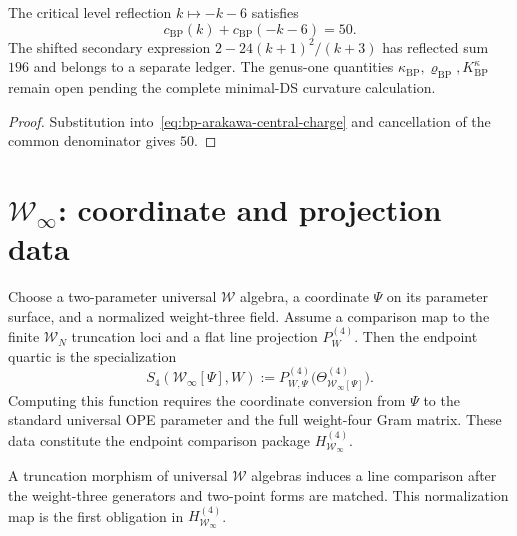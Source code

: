 \begin{corollary}
\label{cor:bp-feigin-frenkel-complementarity}
The critical level reflection $k\mapsto-k-6$ satisfies
\[
 c_{\mathrm{BP}}(k)+c_{\mathrm{BP}}(-k-6)=50.
\]
The shifted secondary expression
$2-24(k+1)^2/(k+3)$ has reflected sum $196$ and belongs to a separate
ledger.  The genus-one quantities
$\kappa_{\mathrm{BP}},\varrho_{\mathrm{BP}},K^\kappa_{\mathrm{BP}}$
remain open pending the complete minimal-DS curvature calculation.
\end{corollary}

\begin{proof}
Substitution into~\eqref{eq:bp-arakawa-central-charge} and cancellation
of the common denominator gives $50$.
\end{proof}

\section{$\mathcal W_\infty$: coordinate and projection data}
\label{sec:w-infinity-psi-degeneration}

\begin{theorem}
\label{thm:w-infinity-psi-degeneration}
Choose a two-parameter universal $\mathcal W$ algebra, a coordinate
$\Psi$ on its parameter surface, and a normalized weight-three field.
Assume a comparison map to the finite $\mathcal W_N$ truncation loci
and a flat line projection $P_W^{(4)}$.  Then the endpoint quartic is
the specialization
\begin{equation}\label{eq:w-infinity-s4}
 S_4(\mathcal W_\infty[\Psi],W)
 :=P_{W,\Psi}^{(4)}\bigl(\Theta_{\mathcal W_\infty[\Psi]}^{(4)}\bigr).
\end{equation}
Computing this function requires the coordinate conversion from
$\Psi$ to the standard universal OPE parameter and the full
weight-four Gram matrix.  These data constitute the endpoint
comparison package $H_{\mathcal W_\infty}^{(4)}$.
\end{theorem}

\begin{remark}
\label{rem:gaberdiel-gopakumar-truncation}
A truncation morphism of universal $\mathcal W$ algebras induces a
line comparison after the weight-three generators and two-point forms
are matched.  This normalization map is the first obligation in
$H_{\mathcal W_\infty}^{(4)}$.
\end{remark}

